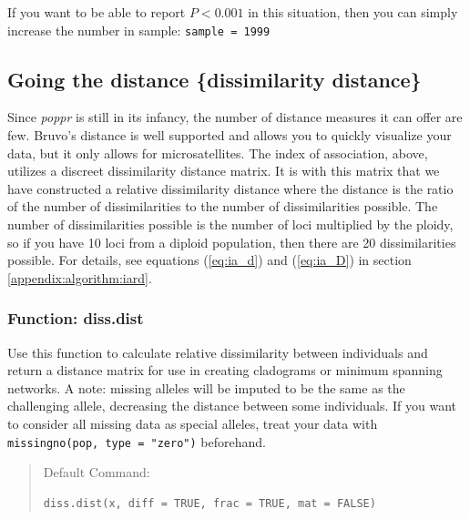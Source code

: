 \documentclass[letterpaper]{article}\usepackage[]{graphicx}\usepackage[]{color}
\makeatletter
\newenvironment{kframe}{%
 \def\at@end@of@kframe{}%
 \ifinner\ifhmode%
  \def\at@end@of@kframe{\end{minipage}}%
  \begin{minipage}{\columnwidth}%
 \fi\fi%
 \def\FrameCommand##1{\hskip\@totalleftmargin \hskip-\fboxsep
 \colorbox{shadecolor}{##1}\hskip-\fboxsep
     \hskip-\linewidth \hskip-\@totalleftmargin \hskip\columnwidth}%
 \MakeFramed {\advance\hsize-\width
   \@totalleftmargin\z@ \linewidth\hsize
   \@setminipage}}%
 {\par\unskip\endMakeFramed%
 \at@end@of@kframe}
\newenvironment{knitrout}{}{} %
\newcommand{\tab}{\hspace*{1em}}
\makeatother
\begin{document}
If you want to be able to report $P < 0.001$ in this situation, then you can simply increase the number in sample: \texttt{sample = 1999}
\subsection{Going the distance \{dissimilarity distance\}}\label{index:dist}
\tab\tab Since \textit{poppr} is still in its infancy, the number of distance measures it can offer are few. Bruvo's distance is well supported and allows you to quickly visualize your data, but it only allows for microsatellites. The index of association, above, utilizes a discreet dissimilarity distance matrix. It is with this matrix that we have constructed a relative dissimilarity distance where the distance is the ratio of the number of dissimilarities to the number of dissimilarities possible. The number of dissimilarities possible is the number of loci multiplied by the ploidy, so if you have 10 loci from a diploid population, then there are 20 dissimilarities possible. For details, see equations (\ref{eq:ia_d}) and (\ref{eq:ia_D}) in section \ref{appendix:algorithm:iard}. 

\subsubsection{Function: diss.dist}\label{index:dist:diss.dist}

\tab\tab Use this function to calculate relative dissimilarity between individuals and return a distance matrix for use in creating cladograms or minimum spanning networks. A note: missing alleles will be imputed to be the same as the challenging allele, decreasing the distance between some individuals. If you want to consider all missing data as special alleles, treat your data with \texttt{missingno(pop, type = "zero")} beforehand. 

\begin{quote}
Default Command:
\begin{knitrout}
\color{fgcolor}\begin{kframe}
\begin{verbatim}
diss.dist(x, diff = TRUE, frac = TRUE, mat = FALSE)
\end{verbatim}
\end{kframe}
\end{knitrout}

\end{quote}
\end{document}
